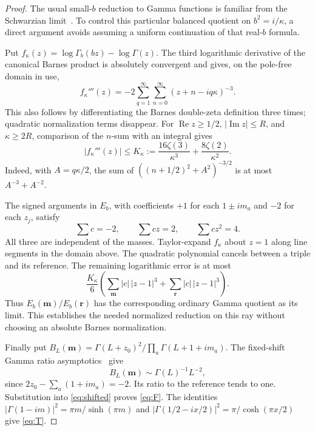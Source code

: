 \documentclass[11pt,a4paper]{article}
\begin{document}
\begin{proof}
The usual small-\(b\) reduction to Gamma functions is familiar from
the Schwarzian limit~\cite{MTV}. To control this particular balanced
quotient on \(b^2=i/\kappa\), a direct argument avoids assuming a
uniform continuation of that real-\(b\) formula.

Put \(f_\kappa(z)=\log\Gamma_b(bz)-\log\Gamma(z)\).
The third logarithmic derivative of the canonical Barnes product is
absolutely convergent and gives, on the pole-free domain in use,
\begin{equation}
 f_\kappa'''(z)=-2\sum_{q=1}^{\infty}\sum_{n=0}^{\infty}
                         (z+n-iq\kappa)^{-3}. \label{eq:lattice}
\end{equation}
This also follows by differentiating the Barnes double-zeta definition
three times; quadratic normalization terms disappear. For
\(\operatorname{Re}z\ge1/2\), \(|\operatorname{Im}z|\le R\), and
\(\kappa\ge2R\), comparison of the \(n\)-sum with an integral gives
\begin{equation}
 |f_\kappa'''(z)|\le
 K_\kappa:=\frac{16\zeta(3)}{\kappa^3}
                +\frac{8\zeta(2)}{\kappa^2}. \label{eq:bound}
\end{equation}
Indeed, with \(A=q\kappa/2\), the sum of
\(((n+1/2)^2+A^2)^{-3/2}\) is at most \(A^{-3}+A^{-2}\).

The signed arguments in \(E_b\), with coefficients \(+1\) for each
\(1\pm im_a\) and \(-2\) for each \(z_j\), satisfy
\begin{equation}
 \sum c= -2,\qquad \sum c z=2,\qquad \sum c z^2=4.
 \label{eq:moments}
\end{equation}
All three are independent of the masses. Taylor-expand \(f_\kappa\)
about \(z=1\) along line segments in the domain above. The quadratic
polynomial cancels between a triple and its reference. The remaining
logarithmic error is at most
\begin{equation}
 \frac{K_\kappa}{6}
 \left(\sum_{\mathbf m}|c|\,|z-1|^3+
       \sum_{\mathbf r}|c|\,|z-1|^3\right). \label{eq:remainder}
\end{equation}
Thus \(E_b(\mathbf m)/E_b(\mathbf r)\) has the corresponding ordinary
Gamma quotient as its limit. This establishes the needed normalized
reduction on this ray without choosing an absolute Barnes normalization.

Finally put \(B_L(\mathbf m)=\Gamma(L+z_0)^2/
\prod_a\Gamma(L+1+im_a)\). The fixed-shift Gamma ratio
asymptotics~\cite{DLMF} give
\[
 B_L(\mathbf m)\sim\Gamma(L)^{-1}L^{-2},
\]
since \(2z_0-\sum_a(1+im_a)=-2\). Its ratio to the reference tends to
one. Substitution into \eqref{eq:shifted} proves \eqref{eq:F}.
The identities
\(|\Gamma(1-im)|^2=\pi m/\sinh(\pi m)\) and
\(|\Gamma(1/2-ix/2)|^2=\pi/\cosh(\pi x/2)\) give \eqref{eq:T}.
\end{proof}
\end{document}
